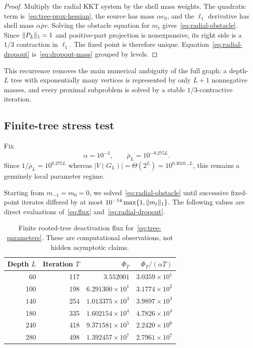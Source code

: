 \begin{proof}
Multiply the radial KKT system by the shell mass weights.  The quadratic term
is~\eqref{eq:tree-prox-hessian}, the source has mass $\alpha e_0$, and the
$\ell_1$ derivative has shell mass $\alpha\bar\rho v$.  Solving the obstacle
equation for $m_t$ gives~\eqref{eq:radial-obstacle}.  Since
$\lVert P_L\rVert_1=1$ and positive-part projection is nonexpansive, its right side
is a $1/3$ contraction in $\ell_1$.  The fixed point is therefore unique.
Equation~\eqref{eq:radial-dropout} is~\eqref{eq:dropout-mass} grouped by
levels.
\end{proof}

This recurrence removes the main numerical ambiguity of the full graph: a
depth-$L$ tree with exponentially many vertices is represented by only $L+1$
nonnegative masses, and every proximal subproblem is solved by a stable
$1/3$-contractive iteration.

\subsection{Finite-tree stress test}

Fix
\begin{equation}
 \alpha=10^{-3},
 \qquad
 \bar\rho_L=10^{-0.275L}.
 \label{eq:tree-parameters}
\end{equation}
Since $1/\bar\rho_L=10^{0.275L}$ whereas
$|V(G_L)|=\Theta(2^L)=10^{0.3010\ldots L}$, this remains a genuinely local
parameter regime.

Starting from $m_{-1}=m_0=0$, we solved~\eqref{eq:radial-obstacle} until
successive fixed-point iterates differed by at most
$10^{-14}\max\{1,\lVert m_t\rVert_1\}$.  The following values are direct
evaluations of~\eqref{eq:flux} and~\eqref{eq:radial-dropout}.

\begin{table}[ht]
\centering
\caption{Finite rooted-tree deactivation flux for~\eqref{eq:tree-parameters}.
These are computational observations, not hidden asymptotic claims.}
\label{tab:tree-flux}
\begin{tabular}{rrrr}
\toprule
Depth $L$ & Iteration $T$ & $\Phi_T$ & $\Phi_T/(\alpha T)$ \\
\midrule
60  & 117 & $3.552001$             & $3.0359\times10^{1}$ \\
100 & 198 & $6.291300\times10^{1}$ & $3.1774\times10^{2}$ \\
140 & 254 & $1.013375\times10^{3}$ & $3.9897\times10^{3}$ \\
180 & 335 & $1.602154\times10^{4}$ & $4.7826\times10^{4}$ \\
240 & 418 & $9.371581\times10^{5}$ & $2.2420\times10^{6}$ \\
280 & 498 & $1.392457\times10^{7}$ & $2.7961\times10^{7}$ \\
\bottomrule
\end{tabular}
\end{table}

